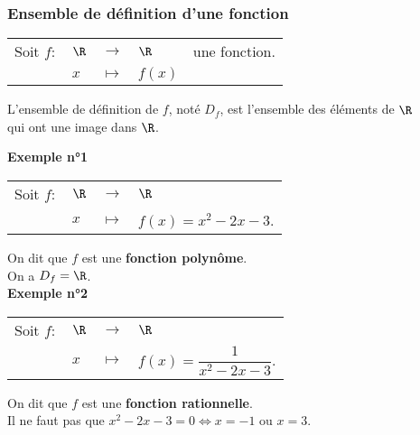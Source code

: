 \subsubsection{Ensemble de définition d'une fonction}

\begin{tabular}{lllll}
\hspace{-.3cm} Soit $f:$ & $\R$ & $\longrightarrow$ & $\R$ & une fonction. \\
& $x$ & $\longmapsto$ & $f(x)$ & \\
\end{tabular}

\vspace*{.5cm}

L'ensemble de définition de $f$, noté $D_f$, est l'ensemble des éléments de $\mathbf{\R}$ \\ qui ont une image dans $\mathbf{\R}$.

\vspace*{.3cm}

\textbf{Exemple n°1} 

\begin{tabular}{llll}
\hspace{-.3cm} Soit $f:$ & $\R$ & $\longrightarrow$ & $\R$ \\
& $x$ & $\longmapsto$ & $f(x) = x^2 - 2x - 3$. \\
\end{tabular}

\vspace*{.3cm}

On dit que $f$ est une \textbf{fonction polynôme}. \\

On a $D_f = \R$. \\

\textbf{Exemple n°2} 

\begin{tabular}{llll}
\hspace{-.3cm} Soit $f:$ & $\R$ & $\longrightarrow$ & $\R$ \\
& $x$ & $\longmapsto$ & $f(x) = \dfrac{1}{x^2 - 2x - 3}$. \\
\end{tabular}

\vspace*{.3cm}

On dit que $f$ est une \textbf{fonction rationnelle}. \\

Il ne faut pas que $x^2 - 2x - 3 = 0 \Longleftrightarrow x = -1$ ou $x = 3$. \\

